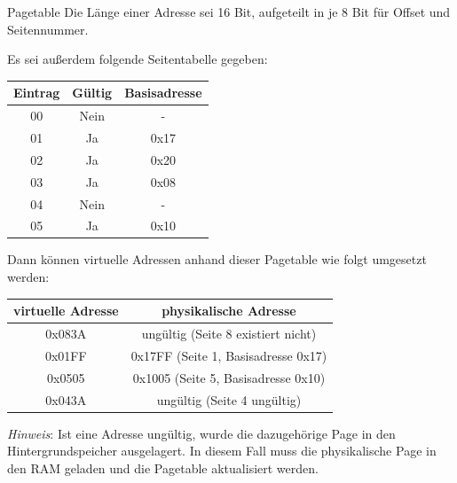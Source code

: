 \begin{example}{Pagetable}
    Die Länge einer Adresse sei 16 Bit, aufgeteilt in je 8 Bit für Offset und Seitennummer.

    Es sei außerdem folgende Seitentabelle gegeben:

    \begin{center}
        \begin{tabular}{|c|c|c|}
            \hline
            \textbf{Eintrag} & \textbf{Gültig} & \textbf{Basisadresse} \\
            \hline
            00               & Nein            & -                     \\
            01               & Ja              & 0x17                  \\
            02               & Ja              & 0x20                  \\
            03               & Ja              & 0x08                  \\
            04               & Nein            & -                     \\
            05               & Ja              & 0x10                  \\
            \hline
        \end{tabular}
    \end{center}

    Dann können virtuelle Adressen anhand dieser Pagetable wie folgt umgesetzt werden:

    \begin{center}
        \begin{tabular}{|c|c|}
            \hline
            \textbf{virtuelle Adresse} & \textbf{physikalische Adresse}      \\
            \hline
            0x083A                     & ungültig (Seite 8 existiert nicht)  \\
            0x01FF                     & 0x17FF (Seite 1, Basisadresse 0x17) \\
            0x0505                     & 0x1005 (Seite 5, Basisadresse 0x10) \\
            0x043A                     & ungültig (Seite 4 ungültig)         \\
            \hline
        \end{tabular}
    \end{center}

    \emph{Hinweis}: Ist eine Adresse ungültig, wurde die dazugehörige Page in den Hintergrundspeicher ausgelagert. In diesem Fall muss die physikalische Page in den RAM geladen und die Pagetable aktualisiert werden.
\end{example}

